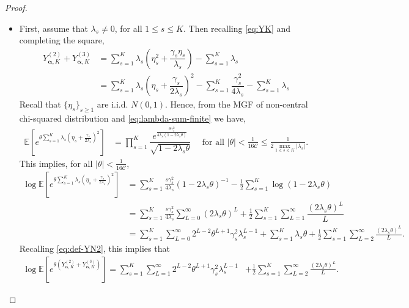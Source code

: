 \documentclass[11pt,reqno]{amsart}
\numberwithin{equation}{section}
\theoremstyle{definition}
\begin{document}
\begin{proof}
\begin{itemize}  
\item[{\it Case} 1:] First, assume that $\lambda_{s}\neq 0$, for all $1\leq s\leq K$. Then recalling \eqref{eq:YK} and completing the square,
\begin{align}\label{eq:def-YN2}
    Y_{\bm \alpha, K}^{(2)} + Y_{\bm \alpha, K}^{(3)}  & = \sum_{s=1}^{K}\lambda_{s}\left(\eta_{s}^{2} + \dfrac{\gamma_{s}\eta_{s}}{\lambda_{s}}\right) - \sum_{s=1}^{K}\lambda_{s} \nonumber \\ 
   & = \sum_{s=1}^{K}\lambda_{s}\left(\eta_{s} + \dfrac{\gamma_{s}}{2\lambda_{s}}\right)^{2} - \sum_{s=1}^{K}\dfrac{\gamma_{s}^{2}}{4\lambda_{s}} - \sum_{s=1}^{K}\lambda_{s}
\end{align}
Recall that $\{\eta_{s}\}_{s \geq 1}$ are i.i.d. $N(0,1)$. Hence, from the MGF of non-central chi-squared distribution and \eqref{eq:lambda-sum-finite} we have, 
\begin{align*}
    \mathbb{E}\left[ e^{\theta \sum_{s=1}^{K}\lambda_{s} (\eta_{s} + \frac{\gamma_{s}}{2\lambda_{s}} )^{2} } \right] 
    & = \prod_{s=1}^{K}\dfrac{ e^{ \frac{ \theta \gamma_{s}^{2}}{4\lambda_{s}\left(1-2\lambda_{s} \theta\right)} } }{\sqrt{1-2\lambda_{s} \theta}} \quad 
    \text{ for all }| \theta |<\frac{1}{16\mathcal{C}} \leq \frac{1}{2 \max_{1 \leq s \leq K} | \lambda_s | } . 
\end{align*}
This implies, for all $|\theta|<\frac{1}{16\mathcal{C}}$, 
\begin{align*}
    \log \mathbb{E}\left[ e^{\theta \sum_{s=1}^{K}\lambda_{s} (\eta_{s} + \frac{\gamma_{s}}{2\lambda_{s}} )^{2} } \right]
    & = \sum_{s=1}^{K}\frac{s\gamma_{s}^{2}}{4\lambda_{s}}(1-2\lambda_{s} \theta)^{-1} - \frac{1}{2}\sum_{s=1}^{K}\log\left(1-2\lambda_{s} \theta\right)\nonumber\\
    & = \sum_{s=1}^{K}\frac{s\gamma_{s}^{2}}{4\lambda_{s}}\sum_{L=0}^{\infty}(2\lambda_{s} \theta)^{L} + \frac{1}{2}\sum_{s=1}^{K}\sum_{L=1}^{\infty}\dfrac{(2\lambda_{s} \theta)^{L}}{L} \nonumber \\ 
    & = \sum_{s=1}^{K}\sum_{L=0}^{\infty}2^{L-2}\theta^{L+1}\gamma_{s}^{2}\lambda_{s}^{L-1} + \sum_{s=1}^{K}\lambda_{s} \theta + \frac{1}{2}\sum_{s=1}^{K}\sum_{L=2}^{\infty}\frac{(2\lambda_{s} \theta)^{L}}{L} . \nonumber 
\end{align*}
Recalling \eqref{eq:def-YN2},  this implies that 
\begin{align}\label{eq:MGF-Y2-nz}
    \log\mathbb{E}\left[ e^{ \theta \left( Y_{\bm \alpha, K}^{(2)} + Y_{\bm \alpha, K}^{(3)}\right) } \right] = \sum_{s=1}^{K}\sum_{L=1}^{\infty}2^{L-2}\theta^{L+1}\gamma_{s}^{2}\lambda_{s}^{L-1}
    & + \frac{1}{2}\sum_{s=1}^{K}\sum_{L=2}^{\infty}\frac{(2\lambda_{s} \theta)^{L}}{L}.
\end{align}



\end{itemize}
\end{proof}
\end{document}
